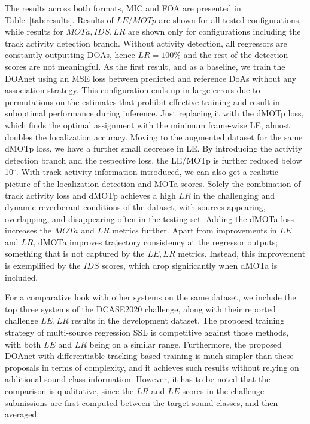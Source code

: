 \documentclass[conference]{IEEEtran}
\begin{document}
The results across both formats, MIC and FOA are presented in Table~\ref{tab:results}. Results of $LE/MOTp$ are shown for all tested configurations, while results for $MOTa, IDS, LR$ are shown only for configurations including the track activity detection branch. Without activity detection, all regressors are constantly outputting DOAs, hence $LR=100\%$ and the rest of the detection scores are not meaningful. As the first result, and as a baseline, we train the DOAnet using an MSE loss between predicted and reference DoAs without any association strategy. This configuration ends up in large errors due to permutations on the estimates that prohibit effective training and result in suboptimal performance during inference. Just replacing it with the dMOTp loss, which finds the optimal assignment with the minimum frame-wise LE, almost doubles the localization accuracy. Moving to the augmented dataset for the same dMOTp loss, we have a further small decrease in LE. By introducing the activity detection branch and the respective loss, the LE/MOTp is further reduced below 10$^\circ$. With track activity information introduced, we can also get a realistic picture of the localization detection and MOTa scores. Solely the combination of track activity loss and dMOTp achieves a high $LR$ in the challenging and dynamic reverberant conditions of the dataset, with sources appearing, overlapping, and disappearing often in the testing set. Adding the dMOTa loss increases the $MOTa$ and $LR$ metrics further. Apart from improvements in $LE$ and $LR$, dMOTa improves trajectory consistency at the regressor outputs; something that is not captured by the $LE,LR$ metrics. Instead, this improvement is exemplified by the $IDS$ scores, which drop significantly when dMOTa is included.

For a comparative look with other systems on the same dataset, we include the top three systems of the DCASE2020 challenge, along with their reported challenge $LE,LR$ results in the development dataset. The proposed training strategy of multi-source regression SSL is competitive against those methods, with both $LE$ and $LR$ being on a similar range. Furthermore, the proposed DOAnet with differentiable tracking-based training is much simpler than these proposals in terms of complexity, and it achieves such results without relying on additional sound class information. However, it has to be noted that the comparison is qualitative, since the $LR$ and $LE$ scores in the challenge submissions are first computed between the target sound classes, and then averaged.
\end{document}
